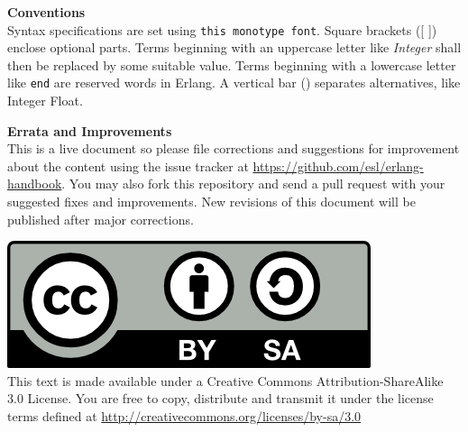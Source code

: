 \documentclass[oneside]{book}
\begin{document}
\vspace{20pt}
\textbf{Conventions}\\
Syntax specifications are set using \texttt{this monotype font}. Square brackets
([ ]) enclose optional parts. Terms beginning with an uppercase letter like
\textit{Integer} shall then be replaced by some suitable value. Terms beginning
with a lowercase letter like \texttt{end} are reserved words in Erlang. A
vertical bar (\textbar{}) separates alternatives, like Integer \textbar{} Float.

\vspace{20pt}
\textbf{Errata and Improvements}\\
This is a live document so please file corrections and suggestions for
improvement about the content using the issue tracker at
\url{https://github.com/esl/erlang-handbook}. You may also fork this repository
and send a pull request with your suggested fixes and improvements. New
revisions of this document will be published after major corrections.

\vspace{20pt}
\includegraphics[scale=0.7]{includes/cc-by-sa.png}\\ This text is made available
under a Creative Commons Attribution-ShareAlike 3.0 License. You are free to
copy, distribute and transmit it under the license terms defined at
\url{http://creativecommons.org/licenses/by-sa/3.0}

\newpage


\tableofcontents





%
%
%
%
%
%
%
%
%
%
%
\end{document}
